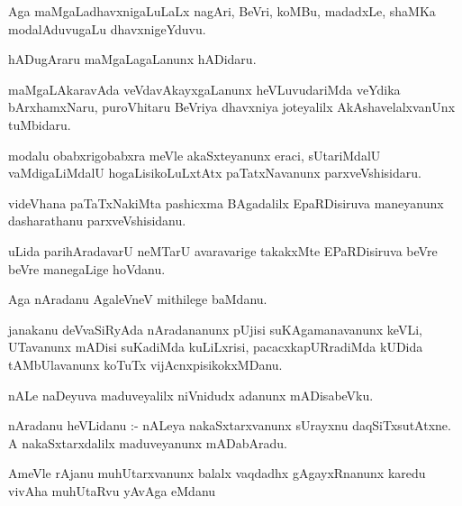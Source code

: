 \documentclass{article}
\begin{document}
\begin{mn}
Aga  maMgaLadhavxnigaLuLaLx  nagAri,  BeVri,  koMBu,  madadxLe,  shaMKa  modalAduvugaLu  dhavxnigeYduvu.
\end{mn}

\begin{mn}
hADugAraru  maMgaLagaLanunx  hADidaru.
\end{mn}

\begin{mn}
maMgaLAkaravAda  veVdavAkayxgaLanunx  heVLuvudariMda  veYdika  bArxhamxNaru,  puroVhitaru  BeVriya  dhavxniya  joteyalilx  
AkAshavelalxvanUnx  tuMbidaru.
\end{mn}

\begin{mn}
modalu  obabxrigobabxra  meVle  akaSxteyanunx  eraci,  sUtariMdalU  vaMdigaLiMdalU  hogaLisikoLuLxtAtx  paTatxNavanunx  parxveVshisidaru.
\end{mn}

\begin{mn}
videVhana  paTaTxNakiMta  pashicxma  BAgadalilx  EpaRDisiruva  maneyanunx  dasharathanu  parxveVshisidanu.
\end{mn}

\begin{mn}
uLida  parihAradavarU  neMTarU  avaravarige  takakxMte  EPaRDisiruva  beVre  beVre  manegaLige  hoVdanu.
\end{mn}

\begin{mn}
Aga  nAradanu  AgaleVneV  mithilege  baMdanu.  
\end{mn}

\begin{mn}
janakanu  deVvaSiRyAda  nAradananunx  pUjisi  suKAgamanavanunx  keVLi,  UTavanunx  mADisi  suKadiMda  kuLiLxrisi,  
pacacxkapURradiMda  kUDida  tAMbUlavanunx  koTuTx  vijAcnxpisikokxMDanu.
\end{mn}

\begin{mn}
nALe  naDeyuva  maduveyalilx  niVnidudx  adanunx  mADisabeVku.
\end{mn}

\begin{mn}
nAradanu  heVLidanu :- nALeya  nakaSxtarxvanunx  sUrayxnu  daqSiTxsutAtxne.  A  nakaSxtarxdalilx  maduveyanunx  mADabAradu.
\end{mn}

\begin{mn}
AmeVle  rAjanu  muhUtarxvanunx  balalx  vaqdadhx  gAgayxRnanunx  karedu  vivAha muhUtaRvu  yAvAga  eMdanu
\end{mn}
\end{document}
